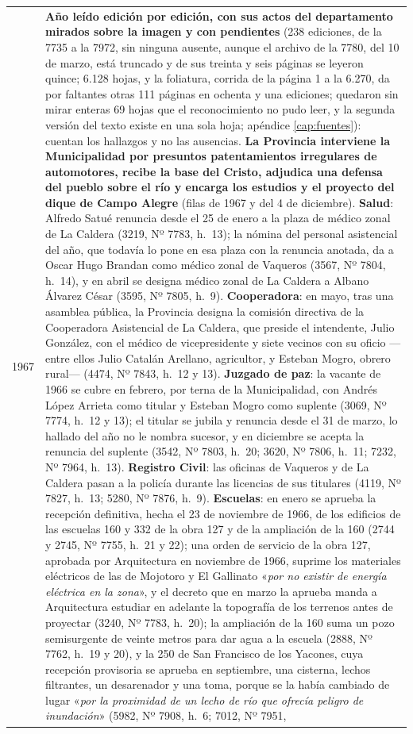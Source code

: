 \begin{longtable}{@{}p{2.7cm}p{10.3cm}@{}}
1967 & \textbf{Año leído edición por edición, con sus actos del departamento mirados sobre la imagen y con pendientes} (238 ediciones, de la 7735 a la 7972, sin ninguna ausente, aunque el archivo de la 7780, del 10 de marzo, está truncado y de sus treinta y seis páginas se leyeron quince; 6.128 hojas, y la foliatura, corrida de la página 1 a la 6.270, da por faltantes otras 111 páginas en ochenta y una ediciones; quedaron sin mirar enteras 69 hojas que el reconocimiento no pudo leer, y la segunda versión del texto existe en una sola hoja; apéndice \ref{cap:fuentes}): cuentan los hallazgos y no las ausencias. \textbf{La Provincia interviene la Municipalidad por presuntos patentamientos irregulares de automotores, recibe la base del Cristo, adjudica una defensa del pueblo sobre el río y encarga los estudios y el proyecto del dique de Campo Alegre} (filas de 1967 y del 4 de diciembre). \textbf{Salud}: Alfredo Satué renuncia desde el 25 de enero a la plaza de médico zonal de La Caldera (3219, Nº 7783, h.\ 13); la nómina del personal asistencial del año, que todavía lo pone en esa plaza con la renuncia anotada, da a Oscar Hugo Brandan como médico zonal de Vaqueros (3567, Nº 7804, h.\ 14), y en abril se designa médico zonal de La Caldera a Albano Álvarez César (3595, Nº 7805, h.\ 9). \textbf{Cooperadora}: en mayo, tras una asamblea pública, la Provincia designa la comisión directiva de la Cooperadora Asistencial de La Caldera, que preside el intendente, Julio González, con el médico de vicepresidente y siete vecinos con su oficio ---entre ellos Julio Catalán Arellano, agricultor, y Esteban Mogro\index{Mogro, Esteban}, obrero rural--- (4474, Nº 7843, h.\ 12 y 13). \textbf{Juzgado de paz}: la vacante de 1966 se cubre en febrero, por terna de la Municipalidad, con Andrés López Arrieta como titular y Esteban Mogro como suplente (3069, Nº 7774, h.\ 12 y 13); el titular se jubila y renuncia desde el 31 de marzo, lo hallado del año no le nombra sucesor, y en diciembre se acepta la renuncia del suplente (3542, Nº 7803, h.\ 20; 3620, Nº 7806, h.\ 11; 7232, Nº 7964, h.\ 13). \textbf{Registro Civil}: las oficinas de Vaqueros y de La Caldera pasan a la policía durante las licencias de sus titulares (4119, Nº 7827, h.\ 13; 5280, Nº 7876, h.\ 9). \textbf{Escuelas}: en enero se aprueba la recepción definitiva, hecha el 23 de noviembre de 1966, de los edificios de las escuelas 160 y 332 de la obra 127 y de la ampliación de la 160 (2744 y 2745, Nº 7755, h.\ 21 y 22); una orden de servicio de la obra 127, aprobada por Arquitectura en noviembre de 1966, suprime los materiales eléctricos de las de Mojotoro y El Gallinato «\textit{por no existir de energía eléctrica en la zona}», y el decreto que en marzo la aprueba manda a Arquitectura estudiar en adelante la topografía de los terrenos antes de proyectar (3240, Nº 7783, h.\ 20); la ampliación de la 160 suma un pozo semisurgente de veinte metros para dar agua a la escuela (2888, Nº 7762, h.\ 19 y 20), y la 250 de San Francisco de los Yacones, cuya recepción provisoria se aprueba en septiembre, una cisterna, lechos filtrantes, un desarenador y una toma, porque se la había cambiado de lugar «\textit{por la proximidad de un lecho de río que ofrecía peligro de inundación}» (5982, Nº 7908, h.\ 6; 7012, Nº 7951, 
\end{longtable}
